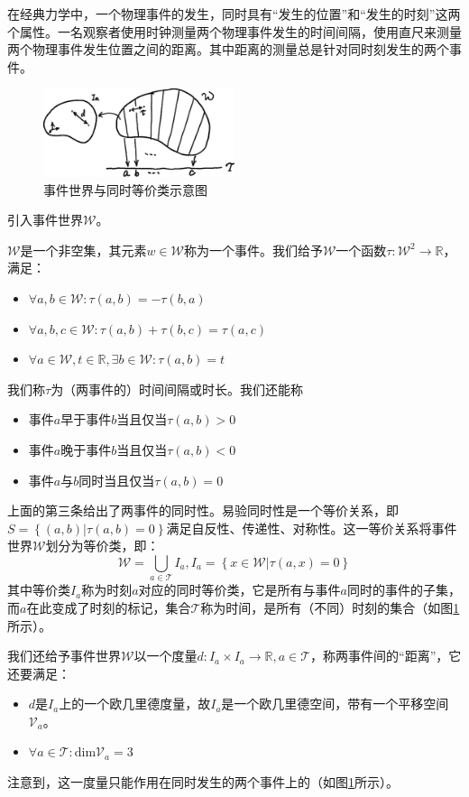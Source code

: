 \documentclass[main.tex]{subfiles}
\begin{document}
在经典力学中，一个物理事件的发生，同时具有“发生的位置”和“发生的时刻”这两个属性。一名观察者使用时钟测量两个物理事件发生的时间间隔，使用直尺来测量两个物理事件发生位置之间的距离。其中距离的测量总是针对同时刻发生的两个事件。

\begin{figure}[h]
\centering
\includegraphics[width=0.5\textwidth]{images/III.1.2.eps}
\caption{事件世界与同时等价类示意图}
\label{fig:III.1.2}
\end{figure}

引入事件世界$\mathcal{W}$。

\begin{definition}[事件世界、时间]
$\mathcal{W}$是一个非空集，其元素$w\in\mathcal{W}$称为一个事件。我们给予$\mathcal{W}$一个函数$\tau:\mathcal{W}^2\rightarrow\mathbb{R}$，满足：
\begin{itemize}
    \item $\forall a,b\in\mathcal{W}:\tau\left(a,b\right)=-\tau\left(b,a\right)$
    \item $\forall a,b,c\in\mathcal{W}:\tau\left(a,b\right)+\tau\left(b,c\right)=\tau\left(a,c\right)$
    \item $\forall a\in\mathcal{W},t\in\mathbb{R},\exists b\in\mathcal{W}:\tau\left(a,b\right)=t$
\end{itemize}
我们称$\tau$为（两事件的）时间间隔或时长。我们还能称
\begin{itemize}
    \item 事件$a$早于事件$b$当且仅当$\tau\left(a,b\right)>0$
    \item 事件$a$晚于事件$b$当且仅当$\tau\left(a,b\right)<0$
    \item 事件$a$与$b$同时当且仅当$\tau\left(a,b\right)=0$
\end{itemize}
上面的第三条给出了两事件的同时性。易验同时性是一个等价关系，即$S=\left\{\left(a,b\right)|\tau\left(a,b\right)=0\right\}$满足自反性、传递性、对称性。这一等价关系将事件世界$\mathcal{W}$划分为等价类，即：
\[\mathcal{W}=\bigcup_{a\in\mathcal{T}}I_a,I_a=\left\{x\in\mathcal{W}|\tau\left(a,x\right)=0\right\}\]
其中等价类$I_a$称为时刻$a$对应的同时等价类，它是所有与事件$a$同时的事件的子集，而$a$在此变成了时刻的标记，集合$\mathcal{T}$称为时间，是所有（不同）时刻的集合（如图\ref{fig:III.1.2}所示）。

我们还给予事件世界$\mathcal{W}$以一个度量$d:I_a\times I_a\rightarrow\mathbb{R},a\in\mathcal{T}$，称两事件间的“距离”，它还要满足：
\begin{itemize}
    \item $d$是$I_a$上的一个欧几里德度量，故$I_a$是一个欧几里德空间，带有一个平移空间$\mathcal{V}_a$。
    \item $\forall a\in\mathcal{T}:\mathrm{dim}\mathcal{V}_a=3$
\end{itemize}
注意到，这一度量只能作用在同时发生的两个事件上的（如图\ref{fig:III.1.2}所示）。
\end{definition}
\end{document}
